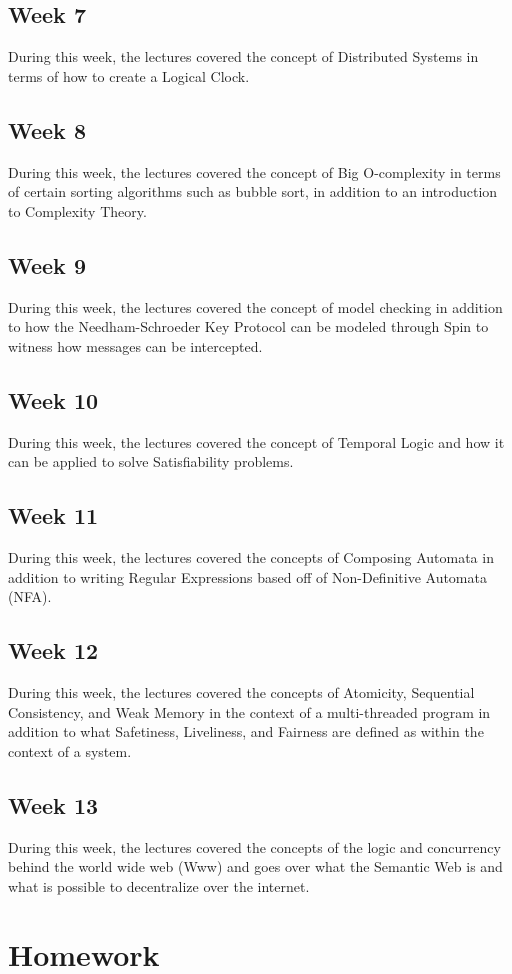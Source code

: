 \documentclass{article}
\theoremstyle{theorem}
\theoremstyle{definition}
\theoremstyle{remark}
\begin{document}
\subsection{Week 7} During this week, the lectures covered the concept of Distributed Systems in terms of how to create a Logical Clock.
\subsection{Week 8} During this week, the lectures covered the concept of Big O-complexity in terms of certain sorting algorithms such as bubble sort, in addition to an introduction to Complexity Theory.
\subsection{Week 9} During this week, the lectures covered the concept of model checking in addition to how the Needham-Schroeder Key Protocol can be modeled through Spin to witness how messages can be intercepted.
\subsection{Week 10} During this week, the lectures covered the concept of Temporal Logic and how it can be applied to solve Satisfiability problems.
\subsection{Week 11} During this week, the lectures covered the concepts of Composing Automata in addition to writing Regular Expressions based off of Non-Definitive Automata (NFA).
\subsection{Week 12} During this week, the lectures covered the concepts of Atomicity, Sequential Consistency, and Weak Memory in the context of a multi-threaded program in addition to what Safetiness, Liveliness, and Fairness are defined as within the context of a system.
\subsection{Week 13} During this week, the lectures covered the concepts of the logic and concurrency behind the world wide web (Www) and goes over what the Semantic Web is and what is possible to decentralize over the internet.
\section{Homework}\label{homework}
\end{document}
